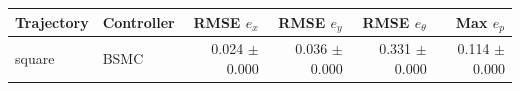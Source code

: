 \begin{tabular}{llrrrr}
\hline
Trajectory & Controller & RMSE $e_x$ & RMSE $e_y$ & RMSE $e_\theta$ & Max $e_p$ \\
\hline
square & BSMC & 0.024 $\pm$ 0.000 & 0.036 $\pm$ 0.000 & 0.331 $\pm$ 0.000 & 0.114 $\pm$ 0.000 \\
\hline
\end{tabular}
